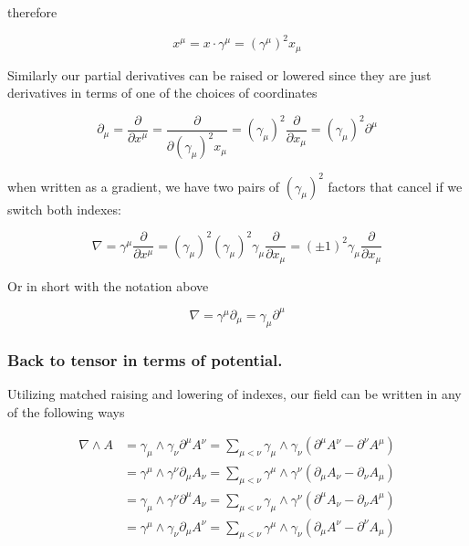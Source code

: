 \documentclass{article}
\newcommand{\grad}[0]{\nabla}
\newcommand{\PD}[2]{\frac{\partial {#2}}{\partial {#1}}}
\begin{document}
therefore

\begin{equation*}
x^{\mu} = x \cdot \gamma^{\mu} = (\gamma^{\mu})^2 x_{\mu}
\end{equation*}

Similarly our partial derivatives can be raised or lowered since they are just derivatives in terms of one of the choices of coordinates

\begin{equation*}
\partial_{\mu} = \PD{x^{\mu}}{} = \PD{(\gamma_{\mu})^2 x_{\mu}}{} = (\gamma_{\mu})^2 \PD{x_{\mu}}{} = (\gamma_{\mu})^2 \partial^{\mu}
\end{equation*}

when written as a gradient, we have two pairs of $(\gamma_{\mu})^2$ factors that cancel if we switch both indexes:

\begin{equation*}
\grad = \gamma^{\mu} \PD{x^{\mu}}{} = (\gamma_{\mu})^2 (\gamma_{\mu})^2 \gamma_{\mu} \PD{x_{\mu}}{} = (\pm 1)^2 \gamma_{\mu} \PD{x_{\mu}}{}
\end{equation*}

Or in short with the notation above

\begin{equation*}
\grad = \gamma^{\mu} \partial_{\mu} = \gamma_{\mu} \partial^{\mu}
\end{equation*}

\subsubsection{ Back to tensor in terms of potential. }
Utilizing matched raising and lowering of indexes, our field can be written in any of the following ways

\begin{align*}
\grad \wedge A
&= {\gamma_{\mu}} \wedge \gamma_{\nu} \partial^{\mu} A^{\nu} = \sum_{\mu<\nu} {\gamma_{\mu}} \wedge \gamma_{\nu} \left( \partial^{\mu} A^{\nu} - \partial^{\nu} A^{\mu} \right) \\
&= {\gamma^{\mu}} \wedge \gamma^{\nu} \partial_{\mu} A_{\nu} = \sum_{\mu<\nu} {\gamma^{\mu}} \wedge \gamma^{\nu} \left( \partial_{\mu} A_{\nu} - \partial_{\nu} A_{\mu} \right) \\
&= {\gamma_{\mu}} \wedge \gamma^{\nu} \partial^{\mu} A_{\nu} = \sum_{\mu<\nu} {\gamma_{\mu}} \wedge \gamma^{\nu} \left( \partial^{\mu} A_{\nu} - \partial_{\nu} A^{\mu} \right) \\
&= {\gamma^{\mu}} \wedge \gamma_{\nu} \partial_{\mu} A^{\nu} = \sum_{\mu<\nu} {\gamma^{\mu}} \wedge \gamma_{\nu} \left( \partial_{\mu} A^{\nu} - \partial^{\nu} A_{\mu} \right) \\
\end{align*}
\end{document}
